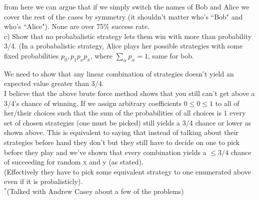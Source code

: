 from here we can argue that if we simply switch the names of Bob and Alice we
cover the rest of the cases by symmetry (it shouldn't matter who's ``Bob" and
who's ``Alice"). None are over 75\% success rate.\\



c) Show that no probabalistic strategy lets them win with more than probability
3/4. (In a probabalistic strategy, Alice plays her possible strategies with some
fixed probabilities $p_0,p_1p_xp_{\bar x}$, where $\sum_\alpha p_\alpha=1$, same
for bob.

We need to show that any linear combination of strategies doesn't yield an
expected value greater than 3/4.\\

I believe that the above brute force method shows that you still can't get above
a 3/4's chance of winning. If we assign arbitrary coefficients $0\leq0\leq1$ to
all of her/their choices such that the sum of the probabilities of all choices
is 1 every set of chosen strategies (one must be picked) still yields a 3/4
chance or lower as shown above. This is equivalent to saying that instead of
talking about their strategies before hand they don't but they still have to
decide on one to pick before they play and we've shown that every combination
yields a $\leq 3/4$ chance of succeeding for random x and y (as stated).\\

(Effectively they have to pick some equivalent strategy to one enumerated above
even if it is probalisticly).\\


$^*$(Talked with Andrew Casey about a few of the problems)












